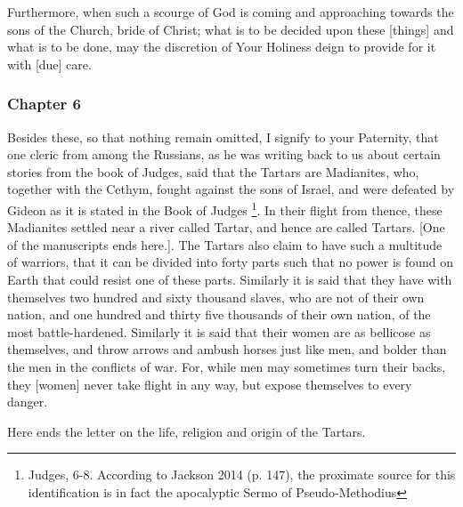 Furthermore, when such a scourge of God is coming and approaching towards the sons of the Church, bride of Christ; what is to be decided upon these [things] and what is to be done, may the discretion of Your Holiness deign to provide for it with [due] care.

 
\subsubsection{Chapter 6}

Besides these, so that nothing remain omitted, I signify to your Paternity, that one cleric from among the Russians, as he was writing back to us about certain stories from the book of Judges, said that the Tartars are Madianites, who, together  with the Cethym, fought against the sons of Israel, and were defeated by Gideon as it is stated in the Book of Judges \footnote{Judges, 6-8. According to Jackson 2014 (p. 147), the proximate source for this identification is in fact the apocalyptic Sermo of Pseudo-Methodius}. In their flight from thence, these Madianites settled near a river called Tartar, and hence are called Tartars. [One of the manuscripts ends here.]. The Tartars also claim to have such a multitude of warriors, that it can be divided into forty parts such that no power is found on Earth that could resist one of these parts. Similarly it is said that they have with themselves two hundred and sixty thousand slaves, who are not of their own nation, and one hundred and thirty five thousands of their own nation, of the most battle-hardened. Similarly it is said that their women are as bellicose as themselves, and throw arrows and ambush horses just like men, and bolder than the men in the conflicts of war. For, while men may sometimes turn their backs, they [women] never take flight in any way, but expose themselves to every danger.

Here ends the letter on the life, religion and origin of the Tartars.
